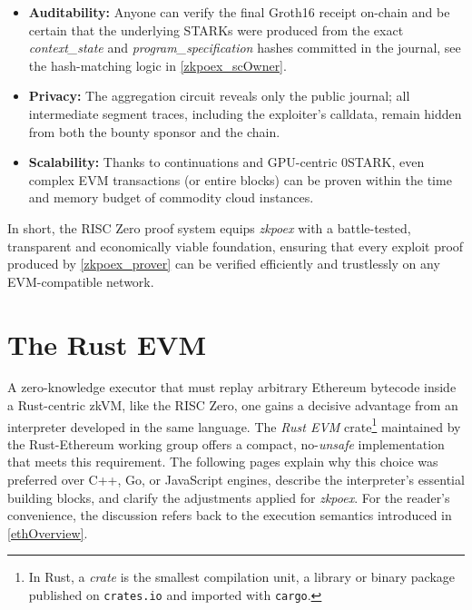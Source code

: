 \begin{itemize}
  \item \textbf{Auditability:}  Anyone can verify the final Groth16 receipt on-chain and be certain that the underlying STARKs were produced from the exact \textit{context\_state} and \textit{program\_specification} hashes committed in the journal, see the hash-matching logic in \ref{zkpoex_scOwner}.
  
  \item \textbf{Privacy:}  The aggregation circuit reveals only the public journal; all intermediate segment traces, including the exploiter’s calldata, remain hidden from both the bounty sponsor and the chain.
  
  \item \textbf{Scalability:}  Thanks to continuations and GPU-centric 0STARK, even complex EVM transactions (or entire blocks) can be proven within the time and memory budget of commodity cloud instances.
  
\end{itemize}

In short, the RISC Zero proof system equips \textit{zkpoex} with a battle-tested,
transparent and economically viable foundation, ensuring that every exploit
proof produced by \ref{zkpoex_prover} can be verified
efficiently and trustlessly on any EVM-compatible network.

\section{The Rust EVM}\makeatletter{}\makeatother
\label{rustevm}

A zero-knowledge executor that must replay arbitrary Ethereum bytecode inside a Rust-centric zkVM, like the RISC Zero, one gains a decisive advantage from an interpreter developed in the same language.  The \textit{Rust EVM} crate\footnote{In Rust, a \emph{crate} is the smallest compilation unit, a library or binary package published on \texttt{crates.io} and imported with \texttt{cargo}.} maintained by the Rust-Ethereum working group offers a compact, no-\textit{unsafe} implementation that meets this requirement\cite{rust_evm_crate}.  The following pages explain why this choice was preferred over C++, Go, or JavaScript engines, describe the interpreter’s essential building blocks, and clarify the adjustments applied for \textit{zkpoex}.  For the reader’s convenience, the discussion refers back to the execution semantics introduced in \ref{ethOverview}.

